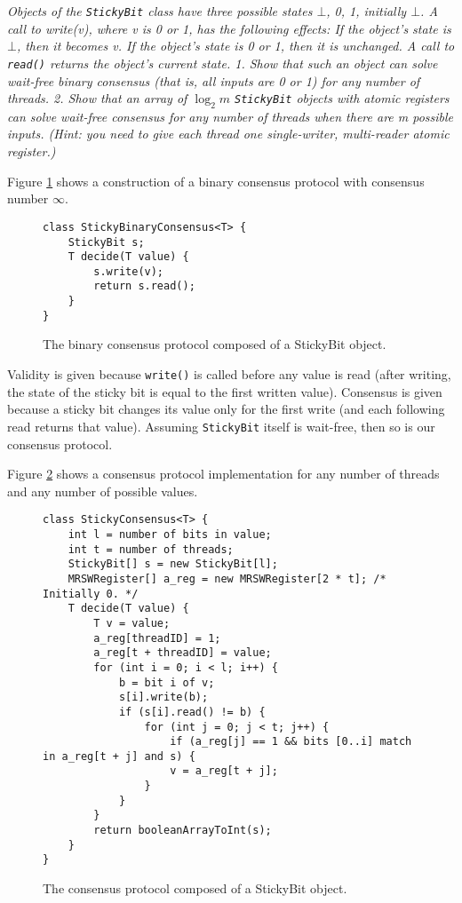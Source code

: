\documentclass[a4paper,10pt]{article}
\begin{document}
\emph{Objects of the \lstinline|StickyBit| class have three possible states $\bot$, 0, 1,
initially $\bot$. A call to write(v), where v is 0 or 1, has the following effects:
If the object’s state is $\bot$, then it becomes v.
If the object’s state is 0 or 1, then it is unchanged.
A call to \lstinline|read()| returns the object’s current state.
1. Show that such an object can solve wait-free binary consensus (that is, all
inputs are 0 or 1) for any number of threads.
2. Show that an array of $\log_2 m$ \lstinline|StickyBit| objects with atomic registers can
solve wait-free consensus for any number of threads when there are m possible inputs. (Hint: you need to give each thread one single-writer, multi-reader
atomic register.)}

\vspace{3mm}

Figure \ref{fig:binarystickyconsensus} shows a construction of a binary consensus protocol with consensus number $\infty$.

\vspace{3mm}

\begin{figure}
\begin{lstlisting}
class StickyBinaryConsensus<T> {
    StickyBit s;
    T decide(T value) {
        s.write(v);
        return s.read();
    }
}
\end{lstlisting}
\caption{The binary consensus protocol composed of a StickyBit object.}
\label{fig:binarystickyconsensus}
\end{figure}

Validity is given because \lstinline|write()| is called before any value is read (after writing, the state of the sticky bit is equal to the first written value). Consensus is given because a sticky bit changes its value only for the first write (and each following read returns that value). Assuming \lstinline|StickyBit| itself is wait-free, then so is our consensus protocol.

Figure \ref{fig:stickyconsensus} shows a consensus protocol implementation for any number of threads and any number of possible values.

\begin{figure}
\begin{lstlisting}
class StickyConsensus<T> {
    int l = number of bits in value;
    int t = number of threads;
    StickyBit[] s = new StickyBit[l];
    MRSWRegister[] a_reg = new MRSWRegister[2 * t]; /* Initially 0. */
    T decide(T value) {
        T v = value;
        a_reg[threadID] = 1;
        a_reg[t + threadID] = value;
        for (int i = 0; i < l; i++) {
            b = bit i of v;
            s[i].write(b);
            if (s[i].read() != b) {
                for (int j = 0; j < t; j++) {
                    if (a_reg[j] == 1 && bits [0..i] match in a_reg[t + j] and s) {
                    v = a_reg[t + j];
                }
            }
        }
        return booleanArrayToInt(s);
    }
}
\end{lstlisting}
\caption{The consensus protocol composed of a StickyBit object.}
\label{fig:stickyconsensus}
\end{figure}
\end{document}
